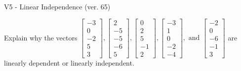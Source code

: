 \begin{exercise}
  \begin{exerciseTitle}V5 - Linear Independence (ver. 65)\end{exerciseTitle}
  \begin{exerciseStatement}
    Explain why the vectors \(\left[\begin{array}{r}
-3 \\
0 \\
-2 \\
5 \\
3
\end{array}\right] , \left[\begin{array}{r}
2 \\
-5 \\
-5 \\
-6 \\
5
\end{array}\right] , \left[\begin{array}{r}
0 \\
2 \\
5 \\
-1 \\
2
\end{array}\right] , \left[\begin{array}{r}
-3 \\
1 \\
0 \\
-2 \\
-4
\end{array}\right] , \text{ and } \left[\begin{array}{r}
-2 \\
0 \\
-6 \\
-1 \\
3
\end{array}\right]\) are linearly dependent or linearly independent.	



\end{exerciseStatement}
\end{exercise}
